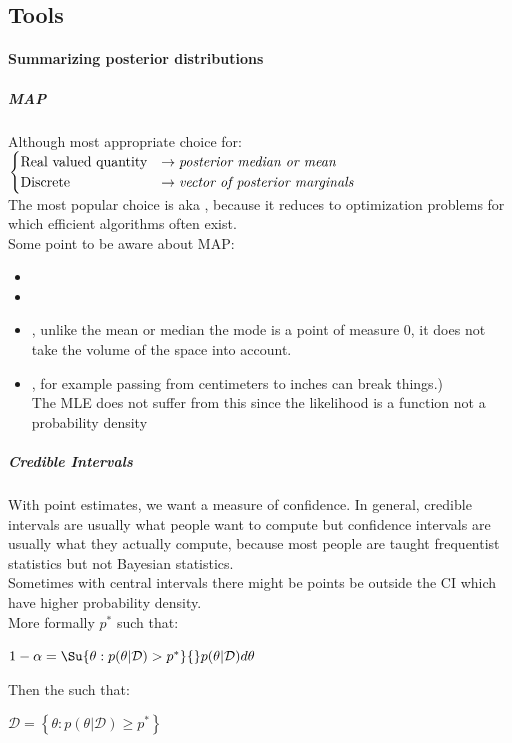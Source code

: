\subsection{Tools}

\paragraph{Summarizing posterior distributions}
\subparagraph{MAP}
Although most appropriate choice for:
$
\begin{cases}
	\text{Real valued quantity} &\rightarrow \text{\emph{posterior median or mean}}\\
	\text{Discrete} &\rightarrow \text{\emph{vector of posterior marginals}}
\end{cases}
$\\
The most popular choice is  aka , because it reduces to
optimization problems for which efficient algorithms often exist.\\
Some point to be aware about MAP:
\begin{itemize}
	\item {}
	\item {}
	\item {}, unlike the mean or median the mode is a
		point of measure 0, it does not take the volume of the space into account.
	\item {}, for example 
		passing from centimeters to inches can break things.)\\ The MLE does not
		suffer from this since the likelihood is a function not a probability
		density
\end{itemize}

\subparagraph{Credible Intervals}
With point estimates, we want a measure of confidence. 
In general, credible intervals are usually what people want to compute but confidence
intervals are usually what they actually compute, because most people are taught 
frequentist statistics but not Bayesian statistics.\\
Sometimes with central intervals there might be points be outside the CI which have higher
probability density.\\
More formally $p^{*}$ such that: 
\begin{center}
	$1-\alpha = 
	\Su{{\theta:p(\theta|\mathcal{D})>p^{*}}}{}p(\theta|\mathcal{D})d\theta$
\end{center}
Then the  such that:
\begin{center}
	$\mathcal{D}=\left\{\theta: p(\theta|\mathcal{D})\geq p^{*}\right\}$
\end{center}
